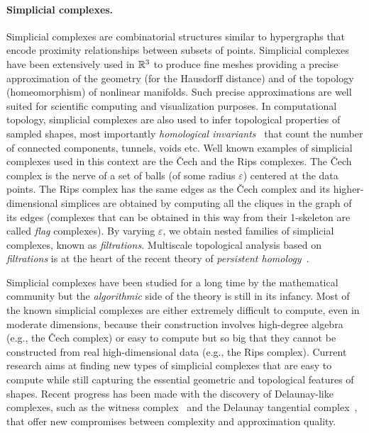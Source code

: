 \paragraph{Simplicial complexes.}  
Simplicial complexes are combinatorial structures similar to hypergraphs that encode proximity relationships between subsets of points.
Simplicial complexes have been extensively used in $\mathbb R ^3$ to produce fine meshes  providing a precise approximation of the geometry  (for the Hausdorff distance) and of the topology  (homeomorphism) of nonlinear manifolds.  Such precise approximations are
 well suited for scientific computing and visualization purposes.  In computational topology, simplicial complexes are also used to infer topological properties of sampled shapes, most importantly {\em homological invariants}~\cite{ah-at-2002} that count the number of connected components, tunnels, voids etc.  Well known examples of simplicial complexes used in this context are the \v{C}ech and the Rips complexes. The \v{C}ech 
complex is the nerve of a set of balls (of some radius $\varepsilon$) centered at the data points. 
The Rips complex  has the same edges as the \v{C}ech complex and its higher-dimensional simplices are obtained by computing all the cliques in the graph of its edges (complexes that can be obtained in this way from their 1-skeleton are called {\em flag} complexes). By varying $\varepsilon$, we obtain nested families of simplicial complexes, known as {\em filtrations.}
Multiscale topological analysis based on {\em filtrations} is at the heart of the recent theory of {\em persistent homology}~\cite{hh-ct-2010,az-tfc-2009}.
 
Simplicial complexes have been studied for a long time by the mathematical community but the {\em algorithmic} side of the theory is still in its infancy. Most of the known simplicial complexes are either extremely difficult to compute, even in moderate dimensions, because their construction involves high-degree algebra (e.g., the  \v{C}ech complex) or easy to compute but so big that they cannot be constructed from real high-dimensional data (e.g., the Rips complex). Current research aims at finding new types of simplicial complexes that are easy to compute while still capturing the essential geometric and topological features of shapes. Recent progress has been made with the discovery of Delaunay-like complexes, such as the witness complex~\cite{cds-tewc-2004} and the Delaunay tangential complex~\cite{geometrica-7142i}, that offer new compromises between complexity and approximation quality.

